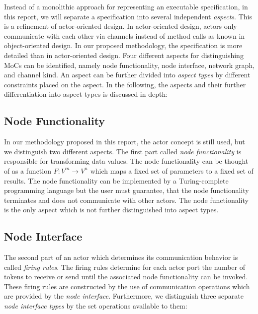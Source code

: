 Instead of a monolithic approach for representing an executable specification,
in this report, we will separate a specification into several
independent \emph{aspects}.
This is a refinement of actor-oriented design.
In actor-oriented design, actors only
communicate with each other via channels instead of method calls as known
in object-oriented design. In our proposed methodology, the specification is more
detailed than in actor-oriented design.
Four different aspects for distinguishing MoCs can be identified,
namely node functionality, node interface, network graph, and
channel kind. An aspect can be further divided into
\emph{aspect types} by different constraints placed on the aspect.
In the following, the aspects and their further
differentiation into aspect types is discussed in depth:

\subsection{Node Functionality}\label{node-functionality}

In our methodology proposed in this report, the actor concept is still used,
but we distinguish two different aspects.
The first part called \emph{node functionality} is responsible
for transforming data values. The node functionality can be
thought of as a function $F: V^{m} \to V^{n}$  which maps a fixed set
of parameters to a fixed set of results. The node functionality
can be implemented by a Turing-complete programming language but
the user must guarantee, that the node functionality terminates
and does not communicate with other actors.
The node functionality is the only aspect which is not further distinguished
into aspect types.

\subsection{Node Interface}\label{node-interface}

The second part of an actor which determines its communication
behavior is called \emph{firing rules}. The firing rules
determine for each actor port the number of tokens to receive or send
until the associated node functionality can be invoked. These firing rules are
constructed by the use of communication operations which are
provided by the \emph{node interface}. Furthermore, we
distinguish three separate \emph{node interface types} by the set
operations available to them:


